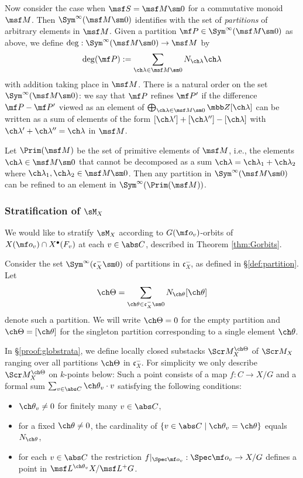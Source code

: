 \documentclass[final]{amsart}
\theoremstyle{remark}
\theoremstyle{definition}
\numberwithin{equation}{section}
\begin{document}
Now consider the case when $\msf S = \msf M\sm 0$ for a commutative monoid
$\msf M$. Then $\Sym^\infty(\msf M\sm 0)$ identifies with the set of 
\emph{partitions} of arbitrary elements in $\msf M$.
Given a partition $\mf P\in \Sym^\infty(\msf M\sm 0)$ as above, 
we define $\deg : \Sym^\infty(\msf M\sm 0) \to \msf M$ by 
\[
    \deg(\mf P) := \sum_{\ch\lambda\in \msf M\sm 0} N_{\ch\lambda}\ch\lambda 
\]
with addition taking place in $\msf M$. 
There is a natural order on the set $\Sym^\infty(\msf M\sm 0)$: 
we say that $\mf P$ refines $\mf P'$ if the difference $\mf P-\mf P'$
viewed as an element of $\bigoplus_{\ch\lambda\in \msf M\sm 0}
 \mbb Z [\ch\lambda]$ can be written as a sum of elements of the
form $[\ch\lambda']+[\ch\lambda'']-[\ch\lambda]$ with $\ch\lambda'+\ch\lambda''=\ch\lambda$ in $\msf M$. 

Let $\Prim(\msf M)$ be the set of primitive elements of $\msf M$, i.e.,
the elements $\ch\lambda\in \msf M\sm 0$ that cannot be decomposed
as a sum $\ch\lambda=\ch\lambda_1+\ch\lambda_2$ where $\ch\lambda_1,\ch\lambda_2 \in \msf M\sm 0$. Then any partition in $\Sym^\infty(\msf M\sm 0)$
can be refined to an element in $\Sym^\infty(\Prim(\msf M))$. 



\subsubsection{Stratification of $\sM_X$}

\label{sect:globstrat}


We would like to stratify $\sM_X$ according to $G(\mf o_v)$-orbits of 
$X(\mf o_v)\cap X^\bullet(F_v)$ at each $v\in \abs C$, described in Theorem \ref{thm:Gorbits}. 


Consider the set $\Sym^\infty(\mathfrak c_X^-\sm 0)$
of partitions in $\mathfrak c_X^-$, as defined
in \S\ref{def:partition}. 
Let  
\[ \ch\Theta = \sum_{\ch\theta\in \mathfrak c_X^- \sm 0} N_{\ch\theta} [\ch\theta] \] 
denote such a partition. 
We will write $\ch\Theta=0$ for the empty partition and 
$\ch\Theta=[\ch\theta]$ for the singleton partition corresponding to a
single element $\ch\theta$. 

In \S\ref{proof:globstrata}, we define locally closed substacks $\Scr M^{\ch\Theta}_X$ of $\Scr M_X$ ranging over all partitions 
$\ch\Theta$ in $\mathfrak c_X^-$.  
For simplicity we only describe $\Scr M^{\ch\Theta}_X$ on $k$-points below:
Such a point consists of a map $f : C\to X/G$ and a formal sum
$\sum_{v\in \abs C} \ch\theta_v \cdot v$ satisfying the following
conditions: 
\begin{itemize}
\item $\ch\theta_v \ne 0$ for finitely many $v\in \abs C$, 
\item for a fixed $\ch\theta \ne 0$, the cardinality of $\{ v\in \abs C \mid \ch\theta_v =\ch\theta\}$ equals $N_{\ch\theta}$, 
\item for each $v\in \abs C$
the restriction $f|_{\Spec \mf o_v} : \Spec \mf o_v \to X/G$ defines a point in $\msf L^{\ch\theta_v} X / \msf L^+ G$.  
\end{itemize} 
\end{document}
